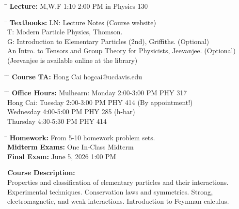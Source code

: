 \documentclass[12pt]{article}
\begin{document}
\noindent
\begin{tabbing}
\hspace*{8em} \= \kill
\textbf {Lecture:} \> M,W,F 1:10-2:00 PM in Physics 130 \\
\end{tabbing}
\noindent
\begin{tabbing}
\hspace*{8em} \= \kill
\textbf{Textbooks:}
\> LN: Lecture Notes (Course website)\\
\> T: Modern Particle Physics, Thomson.\\
\> G: Introduction to Elementary Particles (2nd), Griffiths. (Optional)\\
\> An Intro. to Tensors and Group Theory for Physicists, Jeevanjee. (Optional)\\
\> (Jeevanjee is available online at the library)\\
\end{tabbing}
\noindent
\begin{tabbing}
\hspace*{8em}\= \hspace*{10em} \= \kill
\textbf{Course TA:}
\> Hong Cai \> hogcai@ucdavis.edu \\
\end{tabbing}
\noindent
\begin{tabbing}
\hspace*{8em}\= \hspace*{10em} \= \kill
\textbf{Office Hours:}
\> Mulhearn: \> Monday 2:00-3:00 PM PHY 317\\
\> Hong Cai: \> Tuesday 2:00-3:00 PM PHY 414 (By appointment!)\\
\>           \> Wednesday 4:00-5:00 PM PHY 285 (h-bar)\\
\>           \> Thursday 4:30-5:30 PM PHY 414 \\
\end{tabbing}
\noindent
\begin{tabbing}
\hspace*{12em}\= \kill
\textbf{Homework:} \> From 5-10 homework problem sets.\\
\textbf{Midterm Exams:} \> One In-Class Midterm\\
\textbf{Final Exam:} \>  June 5, 2026 1:00 PM\\
\end{tabbing}
\noindent
\textbf {Course Description:}\\
Properties and classification of elementary particles and their
interactions. Experimental techniques. Conservation laws and
symmetries. Strong, electromagnetic, and weak
interactions. Introduction to Feynman calculus.\\[3pt]
\end{document}
